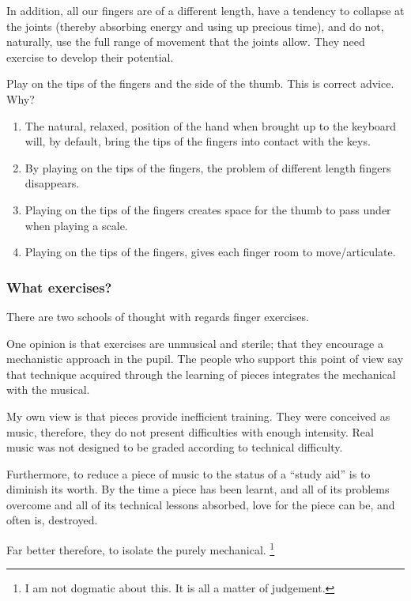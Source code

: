 \documentclass{article}
\begin{document}
In addition, all our fingers are of a different length, have a tendency to collapse at the joints (thereby absorbing energy and using up precious time), and do not, naturally, use the full range of movement that the joints allow.
They need exercise to develop their potential.
\newline

Play on the tips of the fingers and the side of the thumb.
This is correct advice.
Why?

\begin{enumerate}
    \item The natural, relaxed, position of the hand when brought up to the keyboard will, by default, bring the tips of the fingers into contact with the keys.
    \item By playing on the tips of the fingers, the problem of different length fingers disappears.
    \item Playing on the tips of the fingers creates space for the thumb to pass under when playing a scale.
    \item Playing on the tips of the fingers, gives each finger room to move/articulate.
\end{enumerate}


\subsubsection{What exercises?}

There are two schools of thought with regards finger exercises.

One opinion is that exercises are unmusical and sterile; that they encourage a mechanistic approach in the pupil.
The people who support this point of view say that technique acquired through the learning of pieces integrates the mechanical with the musical.

My own view is that pieces provide inefficient training.
They were conceived as music, therefore, they do not present difficulties with enough intensity.
Real music was not designed to be graded according to technical difficulty.

Furthermore, to reduce a piece of music to the status of a ``study aid'' is to diminish its worth.
By the time a piece has been learnt, and all of its problems overcome and all of its technical lessons absorbed, love for the piece can be, and often is, destroyed.

Far better therefore, to isolate the purely mechanical.\footnotemark
    \footnote{I am not dogmatic about this.
    It is all a matter of judgement.}
    \pagebreak
\end{document}

